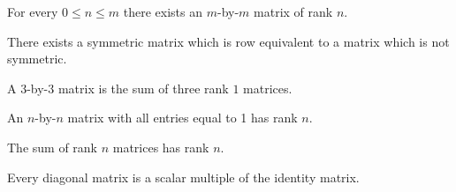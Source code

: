 \documentclass{homework}
\begin{document}
\begin{problem}
  For every $0 \leq n \leq m$ there exists an $m$-by-$m$ matrix of rank $n$.
\end{problem}

\begin{problem}
  There exists a symmetric matrix which is row equivalent to a matrix which
  is not symmetric.
\end{problem}

\begin{problem}
  A $3$-by-$3$ matrix is the sum of three rank $1$ matrices.
\end{problem}

\begin{problem}
  An $n$-by-$n$ matrix with all entries equal to 1 has rank $n$.
\end{problem}

\begin{problem}
  The sum of rank $n$ matrices has rank $n$.
\end{problem}

\begin{problem}
  Every diagonal matrix is a scalar multiple of the identity matrix.
\end{problem}
\end{document}
